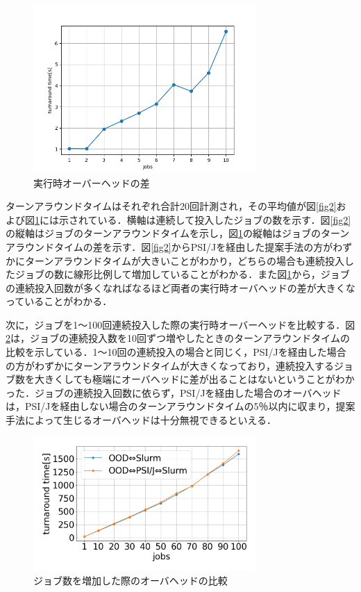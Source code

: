 \documentclass[a4paper,oneside,twocolumn,notitlepage,dvipdfmx]{jsarticle}
\begin{document}
\begin{figure}[tb]
  \centering
  \hspace{-11mm}
  \includegraphics[width=85mm]{./fig/ave_diff_1-20.png}
  \vspace{-10pt}
  \caption{実行時オーバーヘッドの差}
  \label{fig3}
\end{figure}

ターンアラウンドタイムはそれぞれ合計20回計測され，その平均値が図\ref{fig2}および図\ref{fig3}には示されている．横軸は連続して投入したジョブの数を示す．図\ref{fig2}の縦軸はジョブのターンアラウンドタイムを示し，図\ref{fig3}の縦軸はジョブのターンアラウンドタイムの差を示す．図\ref{fig2}からPSI/Jを経由した提案手法の方がわずかにターンアラウンドタイムが大きいことがわかり，どちらの場合も連続投入したジョブの数に線形比例して増加していることがわかる．また図\ref{fig3}から，ジョブの連続投入回数が多くなればなるほど両者の実行時オーバヘッドの差が大きくなっていることがわかる．\par
次に，ジョブを1～100回連続投入した際の実行時オーバーヘッドを比較する．図\ref{fig5}は，ジョブの連続投入数を10回ずつ増やしたときのターンアラウンドタイムの比較を示している．1～10回の連続投入の場合と同じく，PSI/Jを経由した場合の方がわずかにターンアラウンドタイムが大きくなっており，連続投入するジョブ数を大きくしても極端にオーバヘッドに差が出ることはないということがわかった．ジョブの連続投入回数に依らず，PSI/Jを経由した場合のオーバヘッドは，PSI/Jを経由しない場合のターンアラウンドタイムの5％以内に収まり，提案手法によって生じるオーバヘッドは十分無視できるといえる．\par

\begin{figure}[tb]
  \centering
  \hspace{-11mm}
  \includegraphics[width=85mm]{./fig/100jobs.png}
  \vspace{-10pt}
  \caption{ジョブ数を増加した際のオーバヘッドの比較}
  \label{fig5}
\end{figure}
\end{document}
